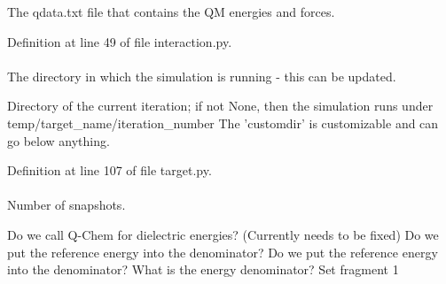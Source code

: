 \-The qdata.\-txt file that contains the \-Q\-M energies and forces. 



\-Definition at line 49 of file interaction.\-py.

\hypertarget{classforcebalance_1_1target_1_1Target_a1da470037ef61c22dc44beb85cfa01a9}{
\paragraph[{rundir}]{}}\label{classforcebalance_1_1target_1_1Target_a1da470037ef61c22dc44beb85cfa01a9}


\-The directory in which the simulation is running -\/ this can be updated. 

\-Directory of the current iteration; if not \-None, then the simulation runs under temp/target\-\_\-name/iteration\-\_\-number \-The 'customdir' is customizable and can go below anything.

\-Definition at line 107 of file target.\-py.

\hypertarget{classforcebalance_1_1interaction_1_1Interaction_ab39f595a8116711d03992a37776ec7e7}{
\paragraph[{select1}]{}}\label{classforcebalance_1_1interaction_1_1Interaction_ab39f595a8116711d03992a37776ec7e7}


\-Number of snapshots. 

\-Do we call \-Q-\/\-Chem for dielectric energies? (\-Currently needs to be fixed) \-Do we put the reference energy into the denominator? \-Do we put the reference energy into the denominator? \-What is the energy denominator? \-Set fragment 1 

